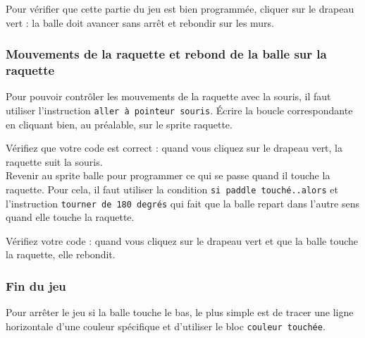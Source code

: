 
Pour vérifier que cette partie du jeu est bien programmée, cliquer sur le drapeau vert : la balle doit avancer sans arrêt et rebondir sur les murs.




\subsubsection{Mouvements de la raquette et rebond de la balle sur la raquette}

Pour pouvoir contrôler les mouvements de la raquette avec la souris, il faut utiliser l'instruction \texttt{aller à pointeur souris}. Écrire la boucle correspondante en cliquant bien, au préalable, sur le sprite raquette.


Vérifiez que votre code est correct : quand vous cliquez sur le drapeau vert, la raquette suit la souris.\\

Revenir au sprite balle pour programmer ce qui se passe quand il touche la raquette. Pour cela, il faut utiliser la condition \texttt{si paddle touché..alors} et l'instruction \texttt{tourner de 180 degrés} qui fait que la balle repart dans l'autre sens quand elle touche la raquette.


Vérifiez votre code : quand vous cliquez sur le drapeau vert et que la balle touche la raquette, elle rebondit.

\subsubsection{Fin du jeu}

Pour arrêter le jeu si la balle touche le bas, le plus simple est de tracer une ligne horizontale d'une couleur spécifique et d'utiliser le bloc \texttt{couleur touchée}.

